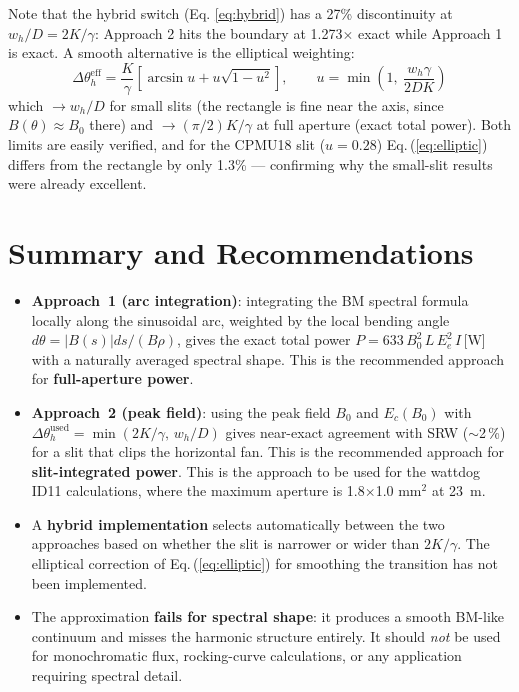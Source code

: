 \documentclass[11pt,a4paper]{article}
\begin{document}
Note that the hybrid switch (Eq. \ref{eq:hybrid}) has a 27\% discontinuity at
$w_h/D=2K/\gamma$:
Approach 2 hits the boundary at 1.273$\times$ exact while Approach 1 is exact.
A smooth alternative is the elliptical weighting:
\begin{equation}
\Delta\theta_h^\text{eff} = \frac{K}{\gamma}\left[\arcsin u + u\sqrt{1-u^2}\right], \qquad u = \min\!\left(1,\ \frac{w_h\gamma}{2DK}\right)
\label{eq:elliptic}
\end{equation}
which  $\rightarrow w_h/D$ for small slits (the rectangle is fine near the axis,
since $B(\theta)\approx B_0$
there) and $ \rightarrow (\pi/2)K/\gamma$
at full aperture (exact total power). Both limits are easily verified, and for the CPMU18 slit ($u=0.28$) Eq.\,(\ref{eq:elliptic}) differs from the rectangle by only 1.3\% --- confirming why the small-slit results were already excellent.


\section{Summary and Recommendations}

\begin{itemize}
  \item \textbf{Approach~1 (arc integration)}: integrating the BM spectral formula
        locally along the sinusoidal arc, weighted by the local bending angle
        $d\theta = |B(s)|ds/(B\rho)$, gives the exact total power
        $P = 633\,B_0^2\,L\,E_e^2\,I$\,[W] with a naturally averaged spectral shape.
        This is the recommended approach for \textbf{full-aperture power}.
  \item \textbf{Approach~2 (peak field)}: using the peak field $B_0$ and
        $E_c(B_0)$ with $\Delta\theta_h^\text{used} = \min(2K/\gamma,\,w_h/D)$
        gives near-exact agreement with SRW ($\sim$2\,\%) for a slit that clips
        the horizontal fan.  This is the recommended approach for
        \textbf{slit-integrated power}. This is the approach to be used for the
		wattdog ID11 calculations, where the maximum aperture is 1.8$\times$1.0 mm$^2$ at 23~m.
  \item A \textbf{hybrid implementation} selects automatically between the two
        approaches based on whether the slit is narrower or wider than $2K/\gamma$. The elliptical correction of Eq.\,(\ref{eq:elliptic}) for smoothing the transition has not been implemented.
  \item The approximation \textbf{fails for spectral shape}: it produces a smooth
        BM-like continuum and misses the harmonic structure entirely.  It should
        \emph{not} be used for monochromatic flux, rocking-curve calculations, or
        any application requiring spectral detail.
\end{itemize}
\end{document}
